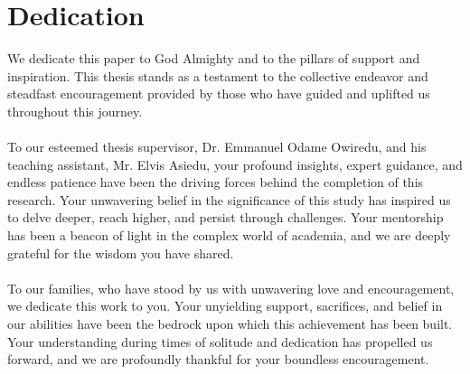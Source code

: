 \chapter*{Dedication}
We dedicate this paper to God Almighty and to the pillars of support and inspiration. This thesis stands as a testament 
to the collective endeavor and steadfast encouragement provided by those who have guided and 
uplifted us throughout this journey.\\
\\
To our esteemed thesis supervisor, Dr. Emmanuel Odame Owiredu, and his teaching assistant, Mr. Elvis Asiedu, your profound insights, expert guidance, and endless patience have been the driving forces behind the completion of this research. Your unwavering belief in the significance of this study has inspired us to delve deeper, reach higher, and persist through challenges. Your mentorship has been a beacon of light in the complex world of academia, and we are deeply grateful for the wisdom you have shared.\\
\\
To our families, who have stood by us with unwavering love and encouragement, we dedicate 
this work to you. Your unyielding support, sacrifices, and belief in our abilities have been the bedrock upon which this achievement has been built. Your understanding during times of 
solitude and dedication has propelled us forward, and we are profoundly thankful for your 
boundless encouragement.





